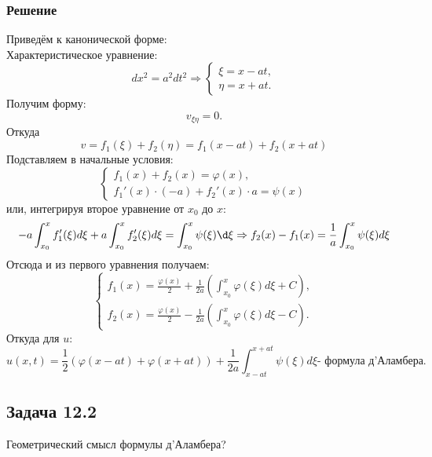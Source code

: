 \documentclass[11pt]{article}
\begin{document}
\subsubsection{Решение}
\label{sec:org04cc1e5}
Приведём к канонической форме:\\
Характеристическое уравнение:
\begin{equation}
dx^2 = a^2dt^2 \Rightarrow
\begin{cases}
\xi = x - at, \\
\eta = x + at.
\end{cases}
\end{equation}
Получим форму:
\begin{equation}
v_{\xi\eta} = 0.
\end{equation}
Откуда
\begin{equation}
v = f_1(\xi) + f_2(\eta) = f_1(x - at) + f_2(x + at)
\end{equation}
Подставляем в начальные условия:
\begin{equation}
\begin{cases}
f_1(x) + f_2(x) = \varphi(x), \\
f_1'(x)\cdot(-a) + f_2'(x)\cdot a = \psi(x)
\end{cases}
\end{equation}
или, интегрируя второе уравнение от $x_0$ до $x$:
\begin{equation}
-a\int_{x_0}^xf_1'(\xi)d\xi + a\int_{x_0}^xf_2'(\xi)d\xi = \int_{x_0}^x\psi(\xi)\d\xi
\Rightarrow
f_2(x) - f_1(x) = \frac1a\int_{x_0}^x\psi(\xi)d\xi
\end{equation}
Отсюда и из первого уравнения получаем:
\begin{equation}
\begin{cases}
f_1(x) = \frac{\varphi(x)}2 + \frac1{2a}\left(\int_{x_0}^x\varphi(\xi)d\xi + C\right), \\
f_2(x) = \frac{\varphi(x)}2 - \frac1{2a}\left(\int_{x_0}^x\varphi(\xi)d\xi - C\right).
\end{cases}
\end{equation}
Откуда для $u$:
\begin{equation}
u(x, t) = \frac12(\varphi(x - at) + \varphi(x + at)) + \frac1{2a}\int_{x - at}^{x + at}\psi(\xi)d\xi \text{- формула д'Аламбера.}
\end{equation}
\subsection{Задача 12.2}
\label{sec:orgd500ed9}
Геометрический смысл формулы д'Аламбера?
\end{document}
